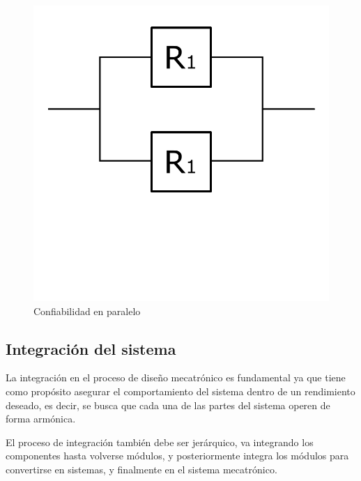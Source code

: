 \begin{figure}[h!]
    \centering
        \includegraphics[scale=0.20]{Proyecto Integrador Figuras/25 Confiabilidad Paralelo.png}
        \caption{Confiabilidad en paralelo}
\end{figure}

\subsection{Integración del sistema}
La integración en el proceso de diseño mecatrónico es fundamental ya que tiene como propósito asegurar el comportamiento del sistema dentro de un rendimiento deseado, es decir, se busca que cada una de las partes del sistema operen de forma armónica. 

El proceso de integración también debe ser jerárquico, va integrando los componentes hasta volverse módulos, y posteriormente integra los módulos para convertirse en sistemas, y finalmente en el sistema mecatrónico. 

